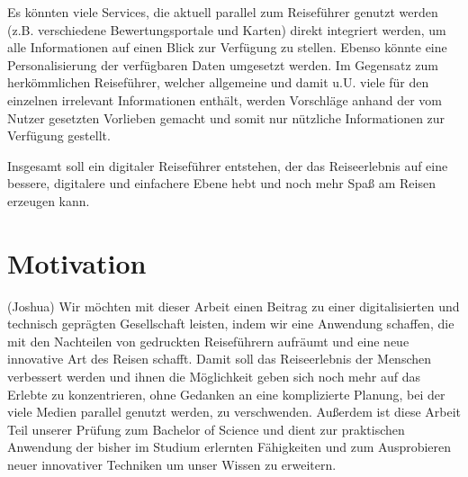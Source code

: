 Es könnten viele Services, die aktuell parallel zum Reiseführer genutzt werden (z.B. verschiedene Bewertungsportale und Karten) direkt integriert werden, um alle Informationen auf einen Blick zur Verfügung zu stellen. Ebenso könnte eine Personalisierung der verfügbaren Daten umgesetzt werden. Im Gegensatz zum herkömmlichen Reiseführer, welcher allgemeine und damit u.U. viele für den einzelnen irrelevant Informationen enthält, werden Vorschläge anhand der vom Nutzer gesetzten Vorlieben gemacht und somit nur nützliche Informationen zur Verfügung gestellt.

\vspace{0.25cm}

Insgesamt soll ein digitaler Reiseführer entstehen, der das Reiseerlebnis auf eine bessere, digitalere und einfachere Ebene hebt und noch mehr Spaß am Reisen erzeugen kann.

\section{Motivation}
(Joshua)
Wir möchten mit dieser Arbeit einen Beitrag zu einer digitalisierten und technisch geprägten Gesellschaft leisten, indem wir eine Anwendung schaffen, die mit den Nachteilen von gedruckten Reiseführern aufräumt und eine neue innovative Art des Reisen schafft. Damit soll das Reiseerlebnis der Menschen verbessert werden und ihnen die Möglichkeit geben sich noch mehr auf das Erlebte zu konzentrieren, ohne Gedanken an eine komplizierte Planung, bei der viele Medien parallel genutzt werden, zu verschwenden.
Außerdem ist diese Arbeit Teil unserer Prüfung zum Bachelor of Science und dient zur praktischen Anwendung der bisher im Studium erlernten Fähigkeiten und zum Ausprobieren neuer innovativer Techniken um unser Wissen zu erweitern.   